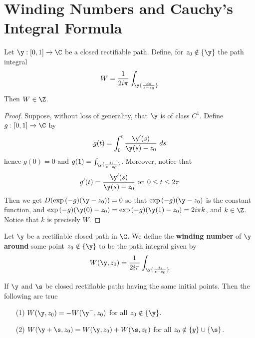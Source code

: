 \section{Winding Numbers and Cauchy's Integral Formula}

\begin{lemma}\label{4.5.1}
    Let $\y:[0,1] \xrightarrow{} \C$ be a closed rectifiable path. Define, for
    $z_0 \notin \{\y\}$ the path integral
    \begin{equation*}
        W=\frac{1}{2i\pi}\int_\y{\frac{dz}{z-z_0}}
    \end{equation*}
    Then $W \in \Z$.
\end{lemma}
\begin{proof}
    Suppose, without loss of generality, that $\y$ is of class  $C^1$. Define
    $g:[0,1] \xrightarrow{} \C$ by
    \begin{equation*}
        g(t)=\int_0^t{\frac{\y'(s)}{\y(s)-z_0} \ ds}
    \end{equation*}
    hence $g(0)=0$ and $g(1)=\int_\y{\frac{dz}{z-z_0}}$. Moreover, notice that
    \begin{equation*}
        g'(t)=\frac{\y'(s)}{\y(s)-z_0} \text{ on } 0 \leq t \leq 2\pi
    \end{equation*}
    Then we get $D{(\exp{(-g)(\y-z_0)})}=0$ so that $\exp{(-g)(\y-z_0)}$ is the
    constant function, and
    $\exp{(-g)(\y(0)-z_0)}=\exp{(-g)(\y(1)-z_0)}=2i\pi{k}$, and $k \in \Z$.
    Notice that $k$ is precisely $W$.
\end{proof}

\begin{definition}
    Let $\y$ be a rectifiable closed path in  $\C$. We define the
    \textbf{winding number} of $\y$  \textbf{around} some point $z_0 \notin
    \{\y\}$ to be the path integral given by
    \begin{equation*}
        W(\y,z_0)=\frac{1}{2i\pi}\int_\y{\frac{dz}{z-z_0}}
    \end{equation*}
\end{definition}

\begin{lemma}\label{4.5.2}
    If $\y$ and $\s$ be closed rectifiable paths having the same initial points.
    Then the following are true
    \begin{enumerate}
        \item[(1)] $W(\y,z_0)=-W(\y^-,z_0)$ for all $z_0 \notin \{\y\}$.

        \item[(2)] $W(\y+\s,z_0)=W(\y,z_0)+W(\s,z_0)$ for all $z_0 \notin \{y\}
            \cup \{\s\}$.
    \end{enumerate}
\end{lemma}

